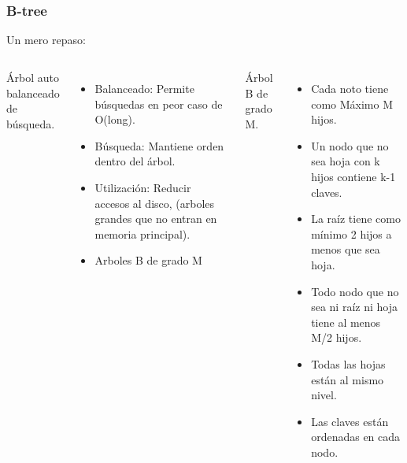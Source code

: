 \documentclass[10pt]{beamer}
\begin{document}
\section{}
\begin{frame}[noframenumbering]
\frametitle{B-tree}
Un mero repaso:

\begin{columns}
    Árbol auto balanceado de búsqueda.
    \begin{itemize}
\pause
       \item Balanceado: Permite búsquedas en peor caso de O(long).
       \item Búsqueda: Mantiene orden dentro del árbol.
\pause
       \item Utilización: Reducir accesos al disco, (arboles grandes que no entran en memoria principal).
       \item Arboles B de grado M
    \end{itemize}

    Árbol B de grado M.
        \begin{itemize}
\pause
          \item Cada noto tiene como Máximo M hijos.
          \item Un nodo que no sea hoja con k hijos contiene k-1 claves.
          \item La raíz tiene como mínimo 2 hijos a menos que sea hoja.
\pause
          \item Todo nodo que no sea ni raíz ni hoja tiene al menos M/2 hijos.
          \item Todas las hojas están al mismo nivel.
          \item Las claves están ordenadas en cada nodo.
        \end{itemize}
\end{columns}
\end{frame}
\end{document}
